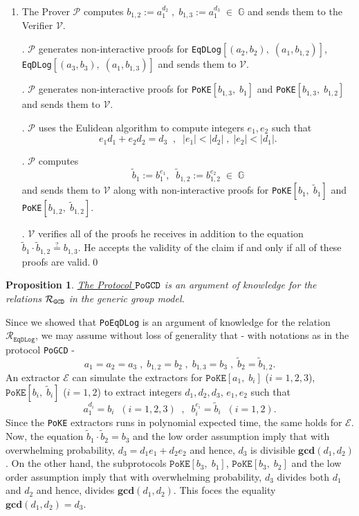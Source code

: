 \documentclass[11pt, lettersize, notitlepage, leqno, footskip=0.6cm]{article}
\newcommand{\ttt}{\texttt}
\newcommand{\bG}{\mathbb{G}}
\newcommand{\wti}{\widetilde}
\newcommand{\mc}{\mathcal}
\newcommand{\mbf}{\mathbf}
\newcommand{\mP}{\mc{P}}
\newcommand{\V}{\mc{V}}
\newcommand{\vs}{\vspace{-0.15cm}}
\newcommand{\op}{overwhelming probability}
\newcommand{\GCD}{\mbf{gcd}}
\newcommand{\E}{\mc{E}}
\newtheorem{Prop}[Thm]{Proposition}
\numberwithin{equation}{section}
\begin{document}
\begin{enumerate}[wide, labelwidth=!, labelindent=0pt]\vs \item The Prover $\mc{P}$ computes $b_{1,2}:= a_1^{d_2}\;,\; b_{1,3}:= a_1^{d_3}\;\in\;\bG$ and sends them to the Verifier $\V$.

. $\mP$ generates non-interactive proofs for \verb|EqDLog|$[(a_2, b_2),\; (a_1, b_{1,2})]$, \verb|EqDLog|$[(a_3, b_3),\; (a_1, b_{1,3})]$ and sends them to $\mc{V}$.

. $\mc{P}$ generates non-interactive proofs for \verb|PoKE|$[b_{1,3},\;b_1 ]$ and \verb|PoKE|$[b_{1,3},\;b_{1,2} ]$ and sends them to $\V$.

. $\mc{P}$ uses the Eulidean algorithm to compute integers $e_1, e_2$ such that \vs $$e_1d_1 + e_2d_2 = d_3\;\;,\;\; |e_1| < |d_2|\;,\; |e_2| < |d_1|.$$

. $\mc{P}$ computes $$\wti{b}_1:= b_1^{e_1},\;\; \wti{b}_{1,2}:= b_{1,2}^{e_2}\;\in\;\bG $$ and sends them to $\V$ along with non-interactive proofs for \verb|PoKE|$[b_1,\; \wti{b}_1]$ and \verb|PoKE|$[b_{1,2},\; \wti{b}_{1,2}]$.

. $\mc{V}$ verifies all of the proofs he receives in addition to the equation $\wti{b}_1\cdot \wti{b}_{1,2}\stackrel{?}{=} b_{1,3}$. He accepts the validity of the claim if and only if all of these proofs are valid.\qed \end{enumerate}



\begin{Prop}\label{GCDProof} \hyperlink{GCD}{The Protocol $\tt{PoGCD}$} is an argument of knowledge for the relations $\mc{R}_{{\tt{GCD}}}$ in the generic group model.\end{Prop}

\begin{prf} Since we showed that \verb|PoEqDLog| is an argument of knowledge for the relation $\mc{R}_{\ttt{EqDLog}}$, we may assume without loss of generality that - with notations as in the protocol \verb|PoGCD| - \vs $$a_1 = a_2 = a_3\;,\; {b}_{1,2} = b_2\;,\;{b}_{1,3} = b_3\;,\;\wti{b}_{2} = \wti{b}_{1,2} .$$ An extractor $\E$ can simulate the extractors for $\ttt{PoKE}[a_1,\; b_i]$ ($i=1,2,3$), $\ttt{PoKE}[b_i,\;\wti{b}_i]$ ($i=1,2$) to extract integers $d_1,d_2,d_3$, $e_1,e_2$ such that \vs $$a_1^{d_i} = b_i\;\; (i=1,2,3)\;\;,\;\;b_i^{e_i} = \wti{b}_i \;\;(i=1,2).$$ Since the \ttt{PoKE} extractors runs in polynomial expected time, the same holds for $\E$. Now, the equation $\wti{b}_1\cdot \wti{b}_2 = b_3$ and the low order assumption imply that with \op, $d_3 = d_1e_1 + d_2e_2 $ and hence, $d_3$ is divisible $\GCD(d_1,d_2)$. On the other hand, the subprotocols $\ttt{PoKE}[b_3,\;b_1]$, $\ttt{PoKE}[b_3,\;b_2]$ and the low order assumption imply that with \op, $d_3$ divides both $d_1$ and $d_2$ and hence, divides $\GCD(d_1,d_2)$. This foces the equality $\GCD(d_1,d_2) = d_3$.\end{prf}
\end{document}
